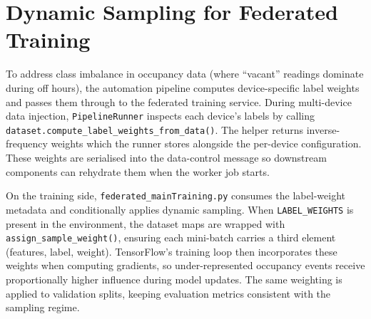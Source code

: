 \section{Dynamic Sampling for Federated Training}
\label{sec:dynamic_sampling}

To address class imbalance in occupancy data (where ``vacant'' readings dominate during off hours), the automation pipeline computes device-specific label weights and passes them through to the federated training service. During multi-device data injection, \texttt{PipelineRunner} inspects each device’s labels by calling \texttt{dataset.compute\_label\_weights\_from\_data()}. The helper returns inverse-frequency weights which the runner stores alongside the per-device configuration. These weights are serialised into the data-control message so downstream components can rehydrate them when the worker job starts.

On the training side, \texttt{federated\_mainTraining.py} consumes the label-weight metadata and conditionally applies dynamic sampling. When \texttt{LABEL\_WEIGHTS} is present in the environment, the dataset maps are wrapped with \texttt{assign\_sample\_weight()}, ensuring each mini-batch carries a third element (features, label, weight). TensorFlow’s training loop then incorporates these weights when computing gradients, so under-represented occupancy events receive proportionally higher influence during model updates. The same weighting is applied to validation splits, keeping evaluation metrics consistent with the sampling regime.

